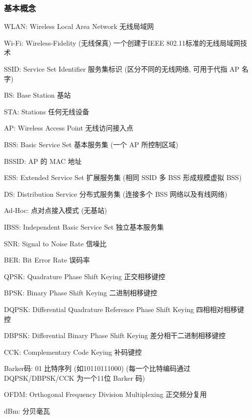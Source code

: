 \documentclass[UTF8,cs4size]{ctexart}
\begin{document}
\subsubsection{基本概念}
\begin{compactitem}
  \item WLAN: Wireless Local Area Network 无线局域网
  \item Wi-Fi: Wireless-Fidelity (无线保真) 一个创建于IEEE 802.11标准的无线局域网技术
  \item SSID: Service Set Identifier 服务集标识 (区分不同的无线网络, 可用于代指 AP 名字)
  \item BS: Base Station 基站
  \item STA: Stations 任何无线设备
  \item AP: Wireless Access Point 无线访问接入点
  \item BSS: Basic Service Set 基本服务集 (一个 AP 所控制区域)
  \item BSSID: AP 的 MAC 地址
  \item ESS: Extended Service Set 扩展服务集 (相同 SSID 多 BSS 形成规模虚拟 BSS)
  \item DS: Distribution Service 分布式服务集 (连接多个 BSS 网络以及有线网络)
  \item Ad-Hoc: 点对点接入模式 (无基站)
  \item IBSS: Independent Basic Service Set 独立基本服务集
  \item SNR: Signal to Noise Rate 信噪比
  \item BER: Bit Error Rate 误码率
  \item QPSK: Quadrature Phase Shift Keying 正交相移键控
  \item BPSK: Binary Phase Shift Keying 二进制相移键控
  \item DQPSK: Differential Quadrature Reference Phase Shift Keying 四相相对相移键控
  \item DBPSK: Differential Binary Phase Shift Keying 差分相干二进制相移键控
  \item CCK: Complementary Code Keying 补码键控
  \item Barker码: 01 比特序列 (如10110111000) (每一个比特编码通过 DQPSK/DBPSK/CCK 为一个11位 Barker 码)
  \item OFDM: Orthogonal Frequency Division Multiplexing 正交频分复用
  \item dBm: 分贝毫瓦
\end{compactitem}
\end{document}
